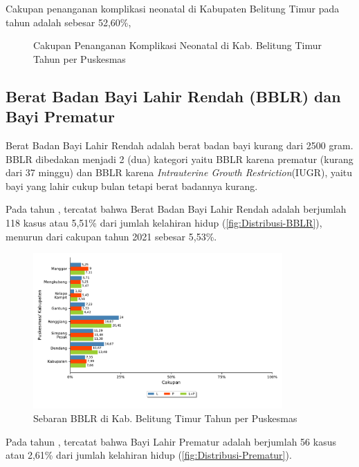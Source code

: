 Cakupan penanganan komplikasi neonatal di Kabupaten Belitung Timur
pada tahun \tP adalah sebesar 52,60\%, %

\begin{figure}[H]
    \centering
    \caption{Cakupan Penanganan Komplikasi Neonatal di Kab. Belitung Timur Tahun \tP per Puskesmas}
    \label{fig:Pelayanan-Komplikasi-Neonatal}
\end{figure}


\subsection{Berat Badan Bayi Lahir Rendah (BBLR) dan Bayi Prematur}
Berat Badan Bayi Lahir Rendah adalah berat badan bayi kurang dari
2500 gram. BBLR dibedakan menjadi 2 (dua) kategori yaitu BBLR karena
prematur (kurang dari 37 minggu) dan BBLR karena \emph{Intrauterine Growth Restriction}(IUGR), yaitu bayi yang lahir cukup bulan tetapi berat badannya kurang.

Pada tahun \tP, tercatat bahwa Berat Badan Bayi Lahir Rendah adalah berjumlah
118 kasus atau 5,51\% dari jumlah kelahiran hidup (\autoref{fig:Distribusi-BBLR}), menurun dari cakupan tahun 2021 sebesar 5,53\%.

\begin{figure}[H]
  \centering
  \includegraphics[width=0.85\textwidth]{bab_05/bab_05_13_BBLR}
  \caption{Sebaran BBLR di Kab. Belitung Timur Tahun \tP per Puskesmas}
  \label{fig:Distribusi-BBLR}
\end{figure}

Pada tahun \tP, tercatat bahwa Bayi Lahir Prematur adalah berjumlah
56 kasus atau 2,61\% dari jumlah kelahiran hidup (\autoref{fig:Distribusi-Prematur}).

